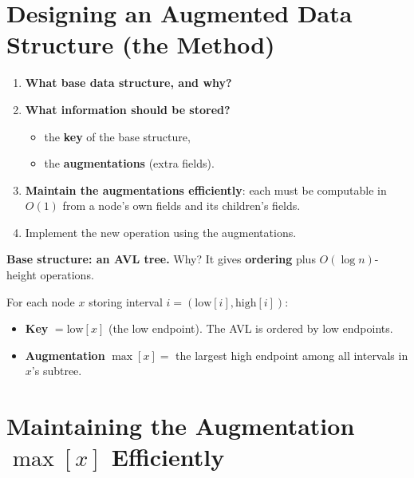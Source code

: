 \documentclass[11pt]{article}
\begin{document}
\section{Designing an Augmented Data Structure (the Method)}

\begin{keybox}
\begin{enumerate}[leftmargin=1.6em,itemsep=3pt]
  \item \textbf{What base data structure, and \textcolor{rustW}{why}?}
  \item \textbf{What information should be stored?}
    \begin{itemize}[leftmargin=1.4em,itemsep=1pt]
      \item the \textbf{key} of the base structure,
      \item the \textbf{augmentations} (extra fields).
    \end{itemize}
  \item \textbf{Maintain the augmentations efficiently}: each must be computable in $O(1)$ from a node's own fields and its children's fields.
  \item Implement the new operation using the augmentations.
\end{enumerate}
\end{keybox}

\begin{keybox}
\textbf{Base structure: an AVL tree.} Why? It gives \textbf{ordering} plus $O(\log n)$-height operations.

For each node $x$ storing interval $i = (\text{low}[i], \text{high}[i])$:
\begin{itemize}[leftmargin=1.4em,itemsep=2pt]
  \item \textbf{Key} $= \text{low}[x]$ (the low endpoint). The AVL is ordered by low endpoints.
  \item \textbf{Augmentation} $\max[x] = $ the largest high endpoint among all intervals in $x$'s subtree.
\end{itemize}
\end{keybox}

\section{Maintaining the Augmentation \texorpdfstring{$\max[x]$}{max[x]} Efficiently}
\end{document}
